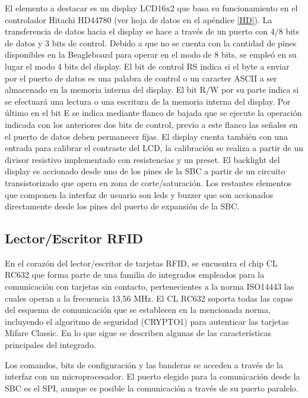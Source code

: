 \newpage
{}

El elemento a destacar es un display LCD16x2 que basa su funcionamiento en el controlador Hitachi HD44780 \cite{dpy} (ver hoja de datos en el apéndice \ref{HD}). La transferencia de datos hacia el display se hace a través de un puerto con 4/8 bits de datos y 3 bits de control. Debido a que no se cuenta con la cantidad de pines disponibles en la Beagleboard para operar en el modo de 8 bits, se empleó en su lugar el modo 4 bits del display. El bit de control RS indica si el byte a enviar por el puerto de datos es una palabra de control o un caracter ASCII a ser almacenado en la memoria interna del display. El bit R/W por su parte indica si se efectuará una lectura o una escritura de la memoria interna del display. Por último en el bit E se indica mediante flanco de bajada que se ejecute la operación indicada con los anteriores dos bits de control, previo a este flanco las señales en el puerto de datos deben permanecer fijas.
El display cuenta también con una entrada para calibrar el contraste del LCD, la calibración se realiza a partir de un divisor resistivo implementado con resistencias y un preset.
El backlight del display es accionado desde uno de los pines de la SBC a partir de un circuito transistorizado que opera en zona de corte/saturación.
Los restantes elementos que componen la interfaz de usuario son leds y buzzer que son accionados directamente desde los pines del puerto de expansión de la SBC.

\subsection{Lector/Escritor RFID}
En el corazón del lector/escritor de tarjetas RFID, se encuentra el chip CL RC632 que forma parte de una familia de integrados empleados para la comunicación con tarjetas sin contacto, pertenecientes a la norma ISO14443 las cuales operan a la frecuencia 13,56 MHz.
El CL RC632 soporta todas las capas del esquema de comunicación que se establecen en la mencionada norma, incluyendo el algoritmo de seguridad (CRYPTO1) para autenticar las tarjetas Mifare Classic. En lo que sigue se describen algunas de las características principales del integrado.

\bigskip
{}

Los comandos, bits de configuración y las banderas se acceden a través de la interfaz con un microprocesador. El puerto elegido para la comunicación desde la SBC es el SPI, aunque es posible la comunicación a través de su puerto paralelo. 

